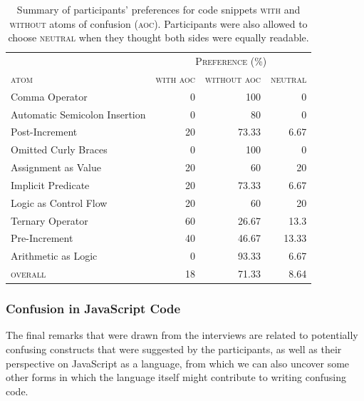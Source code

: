 \begin{table}[!htb]
    \centering
    \caption{Summary of participants' preferences for code snippets \textsc{with} and \textsc{without} atoms of confusion (\textsc{aoc}). Participants were also allowed to choose \textsc{neutral} when they thought both sides were equally readable.}
    \label{tab:interview-results1}
    \begin{tabular}{lrrr}\toprule
      & \multicolumn{3}{c}{\textsc{Preference (\%)}} \\
      \cmidrule(lr){2-4}
         \textsc{atom}           & \multicolumn{1}{c}{\textsc{with aoc}}
                                      &  \multicolumn{1}{c}{\textsc{without aoc}}
                                               & \multicolumn{1}{c}{\textsc{neutral}} \\ \midrule
         Comma Operator                  & 0  & 100    & 0     \\
         Automatic Semicolon Insertion  & 0  & 80     & 0     \\
         Post-Increment                  & 20 & 73.33  & 6.67  \\
         Omitted Curly Braces            & 0  & 100    & 0     \\
         Assignment as Value             & 20 & 60     & 20    \\
         Implicit Predicate              & 20 & 73.33  & 6.67  \\
         Logic as Control Flow           & 20 & 60     & 20    \\
         Ternary Operator                & 60 & 26.67  & 13.3  \\
         Pre-Increment                   & 40 & 46.67  & 13.33 \\ 
         Arithmetic as Logic             & 0  & 93.33  & 6.67  \\ \midrule
         \textsc{overall}                & 18 & 71.33  & 8.64  \\
         \bottomrule
    \end{tabular}
\end{table}


\subsubsection*{Confusion in JavaScript Code} 

The final remarks that were drawn from the interviews are related to potentially confusing constructs that were suggested by the participants, as well as their perspective on JavaScript as a language, from which we can also uncover some other forms in which the language itself might contribute to writing confusing code.

